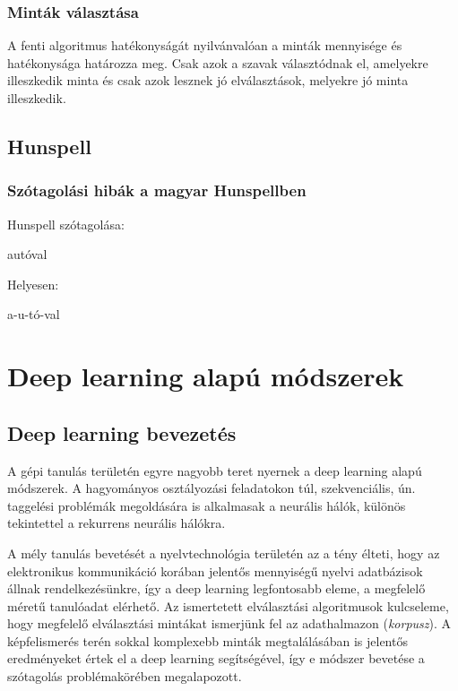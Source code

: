 \documentclass[a4paper, magyar]{article}
\begin{document}
\subsubsection{Minták választása}
A fenti algoritmus hatékonyságát nyilvánvalóan a minták mennyisége és hatékonysága határozza meg. Csak azok a szavak választódnak el, amelyekre illeszkedik minta és csak azok lesznek jó elválasztások, melyekre jó minta illeszkedik.

\subsection{Hunspell}
\subsubsection{Szótagolási hibák a magyar Hunspellben}


\begin{minipage}{0.5\textwidth}
	Hunspell szótagolása:
\begin{checkhyphens}
	autóval
\end{checkhyphens} 		
\end{minipage}\noindent
\begin{minipage}{0.5\textwidth}
	Helyesen:
	
	a-u-tó-val
\end{minipage}


\section{Deep learning alapú módszerek}
\subsection{Deep learning bevezetés}
A gépi tanulás területén egyre nagyobb teret nyernek a deep learning alapú módszerek. A hagyományos osztályozási feladatokon túl, szekvenciális, ún. taggelési problémák megoldására is alkalmasak a neurális hálók, különös tekintettel a rekurrens neurális hálókra.

A mély tanulás bevetését a nyelvtechnológia területén az a tény élteti, hogy az elektronikus kommunikáció korában jelentős mennyiségű nyelvi adatbázisok állnak rendelkezésünkre, így a deep learning legfontosabb eleme, a megfelelő méretű tanulóadat elérhető. Az ismertetett elválasztási algoritmusok kulcseleme, hogy megfelelő elválasztási mintákat ismerjünk fel az adathalmazon (\textit{korpusz}). A képfelismerés terén sokkal komplexebb minták megtalálásában is jelentős eredményeket értek el a deep learning segítségével, így e módszer bevetése a szótagolás problémakörében megalapozott.
\end{document}
